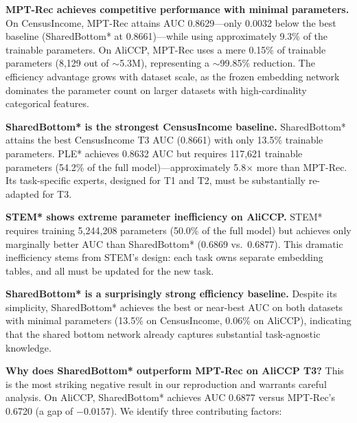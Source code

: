 \documentclass[review,anonymous]{acmart}
\begin{document}
\textbf{MPT-Rec achieves competitive performance with minimal parameters.}
On CensusIncome, MPT-Rec attains AUC 0.8629---only 0.0032 below the best
baseline (SharedBottom* at 0.8661)---while using approximately 9.3\% of the
trainable parameters. On AliCCP, MPT-Rec uses a mere 0.15\% of trainable
parameters (8,129 out of $\sim$5.3M), representing a $\sim$99.85\% reduction.
The efficiency advantage grows with dataset scale, as the frozen embedding
network dominates the parameter count on larger datasets with high-cardinality
categorical features.

\textbf{SharedBottom* is the strongest CensusIncome baseline.}
SharedBottom* attains the best CensusIncome T3 AUC (0.8661) with only 13.5\%
trainable parameters. PLE* achieves 0.8632 AUC but requires 117,621 trainable
parameters (54.2\% of the full model)---approximately 5.8$\times$ more than
MPT-Rec. Its task-specific experts, designed for T1 and T2, must be substantially
re-adapted for T3.

\textbf{STEM* shows extreme parameter inefficiency on AliCCP.}
STEM* requires training 5,244,208 parameters (50.0\% of the full model) but
achieves only marginally better AUC than SharedBottom* (0.6869 vs.\ 0.6877).
This dramatic inefficiency stems from STEM's design: each task owns separate
embedding tables, and all must be updated for the new task.

\textbf{SharedBottom* is a surprisingly strong efficiency baseline.}
Despite its simplicity, SharedBottom* achieves the best or near-best AUC on both
datasets with minimal parameters (13.5\% on CensusIncome, 0.06\% on AliCCP),
indicating that the shared bottom network already captures substantial
task-agnostic knowledge.

\textbf{Why does SharedBottom* outperform MPT-Rec on AliCCP T3?}
This is the most striking negative result in our reproduction and warrants
careful analysis. On AliCCP, SharedBottom* achieves AUC 0.6877 versus MPT-Rec's
0.6720 (a gap of $-0.0157$). We identify three contributing factors:
\end{document}
